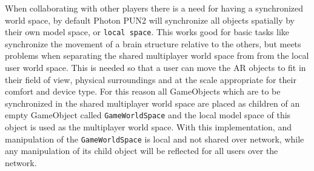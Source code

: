 When collaborating with other players there is a need for having a synchronized world space, by default Photon PUN2 will synchronize all objects spatially by their own model space, or \texttt{local space}. This works good for basic tasks like synchronize the movement of a brain structure relative to the others, but meets problems when separating the shared multiplayer world space from from the local user world space. This is needed so that a user can move the AR objects to fit in their field of view, physical surroundings and at the scale appropriate for their comfort and device type. For this reason all GameObjects which are to be synchronized in the shared multiplayer world space are placed as children of an empty GameObject called \texttt{GameWorldSpace} and the local model space of this object is used as the multiplayer world space. With this implementation, and manipulation of the \texttt{GameWorldSpace} is local and not shared over network, while any manipulation of its child object will be reflected for all users over the network. 
